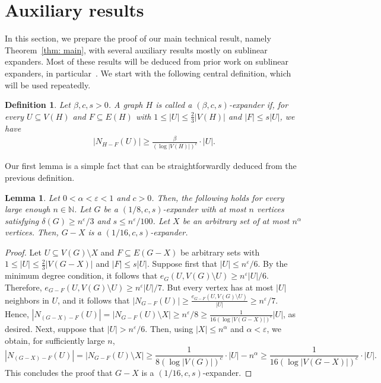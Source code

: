 \documentclass[11pt,reqno]{article}
\newtheorem{lemma}[theorem]{Lemma}
\newtheorem{definition}[theorem]{Definition}
\begin{document}
\section{Auxiliary results}\label{sec:aux}
In this section, we prepare the proof of our main technical result, namely Theorem~\ref{thm: main}, with several auxiliary results mostly on sublinear expanders. Most of these results will be deduced from prior work on sublinear expanders, in particular~\cite{expanders}. We start with the following central definition, which will be used repeatedly.
\begin{definition}
    Let $\beta,c,s>0$. A graph $H$ is called a \emph{$(\beta,c,s)$-expander} if, for every $U\subseteq V(H)$ and $F\subseteq E(H)$ with $1\leq|U|\leq \frac{2}{3}|V(H)|$ and $|F|\leq s|U|$, we have
    \begin{align*}
        |N_{H-F}(U)|\geq \frac{\beta}{(\log |V(H)|)^c}\cdot |U|.
    \end{align*}
\end{definition}
Our first lemma is a simple fact that can be straightforwardly deduced from the previous definition.
\begin{lemma}\label{lem: can remove}
    Let $0<\alpha<\varepsilon<1$ and $c>0$. Then, the following holds for every large enough $n\in \mathbb{N}$. Let $G$ be a $(1/8,c,s)$-expander with at most $n$ vertices satisfying $\delta(G)\geq n^{\varepsilon}/3$ and $s\le n^\varepsilon /100$. Let $X$ be an arbitrary set of at most $n^{\alpha}$ vertices. Then, $G-X$ is a $(1/16,c,s)$-expander.
\end{lemma}
\begin{proof}
    Let $U\subseteq V(G)\setminus X$ and $F\subseteq E(G-X)$ be arbitrary sets with $1\leq |U|\leq \frac{2}{3}|V(G-X)|$ and $|F|\leq s|U|$. Suppose first that $|U|\leq n^{\varepsilon}/6$. By the minimum degree condition, it follows that $e_G(U,V(G)\setminus U)\geq n^{\varepsilon}|U|/6$. Therefore, $e_{G-F}(U,V(G)\setminus U)\geq n^{\varepsilon}|U|/7$. But every vertex has at most $|U|$ neighbors in $U$, and it follows that $|N_{G-F}(U)|\geq \frac{e_{G-F}(U,V(G)\setminus U)}{|U|}\ge  n^{\varepsilon}/7$. Hence, $|N_{(G-X)-F}(U)|=|N_{G-F}(U)\setminus X|\geq n^{\varepsilon}/8\ge \frac{1}{16(\log |V(G-X)|)^c}|U|$, as desired. Next, suppose that $|U|>n^{\varepsilon}/6$. Then, using $|X|\le n^{\alpha}$ and $\alpha<\varepsilon$, we obtain, for sufficiently large $n$, 
    $$|N_{(G-X)-F}(U)|=|N_{G-F}(U)\setminus X|\geq\frac{1}{8(\log |V(G)|)^c}\cdot |U|-n^{\alpha}\geq \frac{1}{16(\log |V(G-X)|)^c}\cdot |U|.$$ 
    This concludes the proof that $G-X$ is a $(1/16,c,s)$-expander.
\end{proof}
\end{document}
